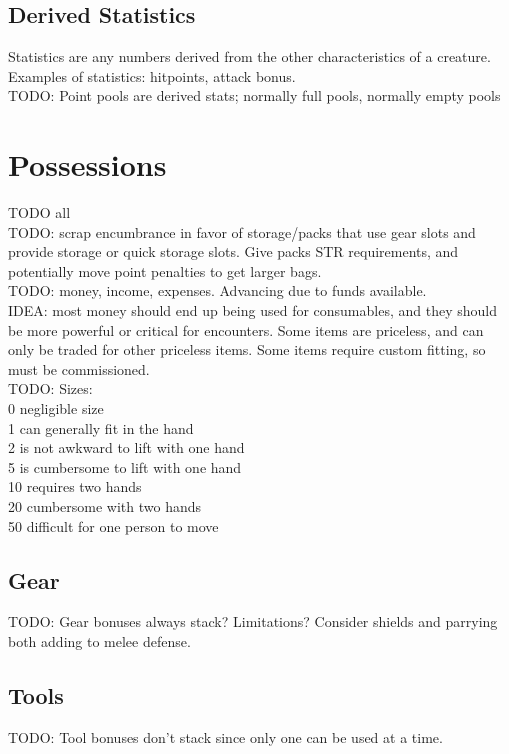 \documentclass[letterpaper,titlepage,openany,twocolumn]{book}
\begin{document}
\section{Derived Statistics}
Statistics are any numbers derived from the other characteristics of a creature. Examples of statistics: hitpoints, attack bonus.\\
TODO: Point pools are derived stats; normally full pools, normally empty pools\\

\chapter{Possessions}
TODO all\\
TODO: scrap encumbrance in favor of storage/packs that use gear slots and provide storage or quick storage slots. Give packs STR requirements, and potentially move point penalties to get larger bags.\\
TODO: money, income, expenses. Advancing due to funds available.\\
IDEA: most money should end up being used for consumables, and they should be more powerful or critical for encounters. Some items are priceless, and can only be traded for other priceless items. Some items require custom fitting, so must be commissioned.\\
TODO: Sizes:\\
	0	negligible size\\
	1	can generally fit in the hand\\
	2	is not awkward to lift with one hand\\
	5	is cumbersome to lift with one hand\\
	10	requires two hands\\
	20	cumbersome with two hands\\
	50	difficult for one person to move\\

\section{Gear}
TODO: Gear bonuses always stack? Limitations? Consider shields and parrying both adding to melee defense.\\

\section{Tools}
TODO: Tool bonuses don’t stack since only one can be used at a time.\\
\end{document}
